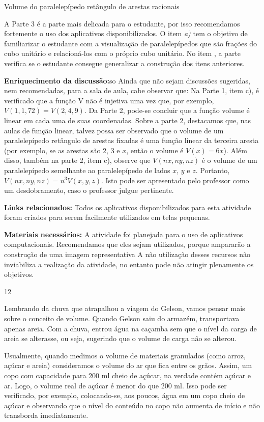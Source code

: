 \begin{sugestions}{Volume do paralelepípedo retângulo de arestas racionais}
{
A Parte 3 é a parte mais delicada para o estudante, por isso recomendamos fortemente o uso dos aplicativos disponibilizados.
O item \textit{a)} tem o objetivo de familiarizar o estudante com a visualização de paralelepípedos que são frações do cubo unitário e relacioná-los com o próprio cubo unitário.
No item , a parte  verifica se o estudante consegue generalizar a construção dos itens anteriores.

\textbf{Enriquecimento da discussão:}so
Ainda que não sejam discussões sugeridas, nem recomendadas, para a sala de aula, cabe observar que:
Na Parte 1, item c), é verificado que a função V não é injetiva uma vez que, por exemplo, \(V(1, 1, 72) = V(2, 4, 9)\).
Da Parte 2, pode-se concluir que a função volume é linear em cada uma de suas coordenadas.
Sobre a parte 2, destacamos que, nas aulas de função linear, talvez possa ser observado que o volume de um paralelepípedo retângulo de arestas fixadas é uma função linear da terceira aresta (por exemplo, se as arestas são 2, 3 e \(x\), então o volume é \(V(x) = 6x\)).
Além disso, também na parte 2, item c), observe que \(V(nx, ny, nz)\) é o volume de um paralelepípedo semelhante ao paralelepípedo de lados  \(x\), \(y\) e \(z\). Portanto, \(V(nx, ny, nz) = n^3V(x, y, z)\). Isto pode ser apresentado pelo professor como um desdobramento, caso o professor julgue pertinente.

\textbf{Links relacionados:}
Todos os aplicativos disponibilizados para esta atividade foram criados para serem facilmente utilizados em telas pequenas.

\textbf{Materiais necessários:}
A atividade foi planejada para o uso de aplicativos computacionais. Recomendamos que eles sejam utilizados, porque ampararão a construção de uma imagem representativa  A não utilização desses recursos não inviabiliza a realização da atividade, no entanto pode não atingir plenamente os objetivos.
}{1}{2}
\end{sugestions}

\begin{knowledge}

Lembrando da chuva que atrapalhou a viagem do Gelson, vamos pensar mais sobre o conceito de volume. Quando Gelson saiu do armazém, transportava apenas areia. Com a chuva, entrou água na caçamba sem que o nível da carga de areia se alterasse, ou seja, sugerindo que o volume de carga não se alterou.

Usualmente, quando medimos o volume de materiais granulados (como arroz, açúcar e areia) consideramos o volume do ar que fica entre os grãos. Assim, um copo com capacidade para $200$ ml cheio de açúcar, na verdade contém açúcar e ar. Logo, o volume real de açúcar é menor do que $200$ ml. Isso pode ser verificado, por exemplo, colocando-se, aos poucos, água em um copo cheio de açúcar e observando que o nível do conteúdo no copo não aumenta de início e não transborda imediatamente.
\end{knowledge}

